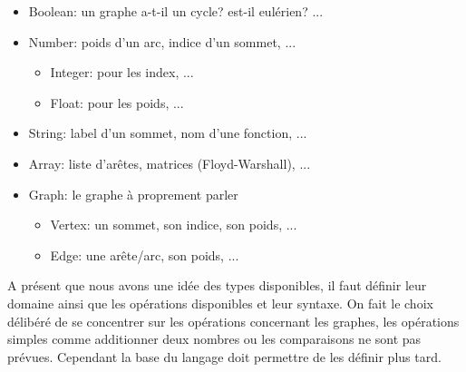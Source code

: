 \documentclass[french]{article}
\begin{document}
				\begin{itemize}
					\item Boolean: un graphe a-t-il un cycle? est-il eulérien? ...
					\item Number: poids d'un arc, indice d'un sommet, ...
					\begin{itemize}
						\item Integer: pour les index, ...
						\item Float: pour les poids, ...
					\end{itemize}
					\item String: label d'un sommet, nom d'une fonction, ...
					\item Array: liste d'arêtes, matrices (Floyd-Warshall), ...
					\item Graph: le graphe à proprement parler
					\begin{itemize}
						\item Vertex: un sommet, son indice, son poids, ...
						\item Edge: une arête/arc, son poids, ...
					\end{itemize}
				\end{itemize} 
				
			A présent que nous avons une idée des types disponibles, il faut définir leur domaine ainsi que les opérations disponibles et leur syntaxe. On fait le choix délibéré de se concentrer sur les opérations concernant les graphes, les opérations simples comme additionner deux nombres ou les comparaisons ne sont pas prévues. Cependant la base du langage doit permettre de les définir plus tard. 
			
\end{document}
